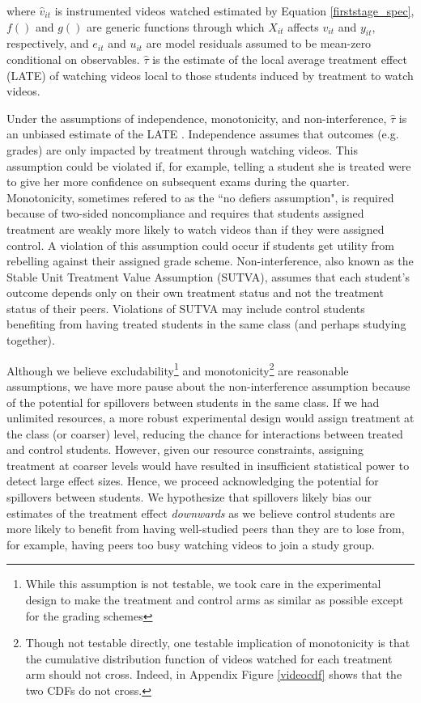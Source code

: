 \documentclass[12pt]{article}
\begin{document}
where $\hat{v}_{it}$ is instrumented videos watched estimated by Equation \ref{firststage_spec}, $f()$ and $g()$ are generic functions through which $X_{it}$ affects $v_{it}$ and $y_{it}$, respectively, and $e_{it}$ and $u_{it}$ are model residuals assumed to be mean-zero conditional on observables. $\hat{\tau}$ is the estimate of the local average treatment effect (LATE) of watching videos local to those students induced by treatment to watch videos.

Under the assumptions of independence, monotonicity, and non-interference, $\hat{\tau}$ is an unbiased estimate of the LATE \parencite{ai1995}. Independence assumes that outcomes (e.g. grades) are only impacted by treatment through watching videos. This assumption could be violated if, for example, telling a student she is treated were to give her more confidence on subsequent exams during the quarter. Monotonicity, sometimes refered to as the ``no defiers assumption", is required because of two-sided noncompliance and requires that students assigned treatment are weakly more likely to watch videos than if they were assigned control. A violation of this assumption could occur if students get utility from rebelling against their assigned grade scheme. Non-interference, also known as the Stable Unit Treatment Value Assumption (SUTVA), assumes that each student's outcome depends only on their own treatment status and not the treatment status of their peers. Violations of SUTVA may include control students benefiting from having treated students in the same class (and perhaps studying together).

Although we believe excludability\footnote{While this assumption is not testable, we took care in the experimental design to make the treatment and control arms as similar as possible except for the grading schemes} and monotonicity\footnote{Though not testable directly, one testable implication of monotonicity is that the cumulative distribution function of videos watched for each treatment arm should not cross. Indeed, in Appendix Figure \ref{videocdf} shows that the two CDFs do not cross.} are reasonable assumptions, we have more pause about the non-interference assumption because of the potential for spillovers between students in the same class. If we had unlimited resources, a more robust experimental design would assign treatment at the class (or coarser) level, reducing the chance for interactions between treated and control students. However, given our resource constraints, assigning treatment at coarser levels would have resulted in insufficient statistical power to detect large effect sizes. Hence, we proceed acknowledging the potential for spillovers between students. We hypothesize that spillovers likely bias our estimates of the treatment effect \textit{downwards} as we believe control students are more likely to benefit from having well-studied peers than they are to lose from, for example, having peers too busy watching videos to join a study group.
\end{document}
